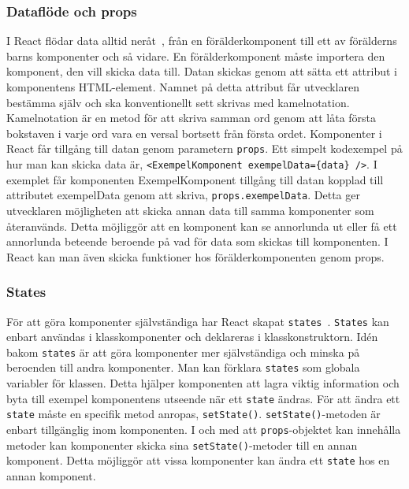 \subsubsection{Dataflöde och props}
I React flödar data alltid neråt~\cite{react-states}, från en förälderkomponent till ett av förälderns barns komponenter och så vidare. En förälderkomponent måste importera den komponent, den vill skicka data till. Datan skickas genom att sätta ett attribut i komponentens HTML-element. Namnet på detta attribut får utvecklaren bestämma själv och ska konventionellt sett skrivas med kamelnotation. Kamelnotation är en metod för att skriva samman ord genom att låta första bokstaven i varje ord vara en versal bortsett från första ordet. Komponenter i React får tillgång till datan genom parametern \texttt{props}. Ett simpelt kodexempel på hur man kan skicka data är, \texttt{<ExempelKomponent exempelData=\{data\} />}. I exemplet får komponenten ExempelKomponent tillgång till datan kopplad till attributet exempelData genom att skriva, \texttt{props.exempelData}. Detta ger utvecklaren möjligheten att skicka annan data till samma komponenter som återanvänds. Detta möjliggör att en komponent kan se annorlunda ut eller få ett annorlunda beteende beroende på vad för data som skickas till komponenten. I React kan man även skicka funktioner hos förälderkomponenten genom props. 

\subsubsection{States}
\label{axel:react-states} 
För att göra komponenter självständiga har React skapat \texttt{states}~\cite{react-states}. \texttt{States} kan enbart användas i klasskomponenter och deklareras i klasskonstruktorn. Idén bakom \texttt{states} är att göra komponenter mer självständiga och minska på beroenden till andra komponenter. Man kan förklara \texttt{states} som globala variabler för klassen. Detta hjälper komponenten att lagra viktig information och byta till exempel komponentens utseende när ett \texttt{state} ändras. För att ändra ett \texttt{state} måste en specifik metod anropas, \texttt{setState()}. \texttt{setState()}-metoden är enbart tillgänglig inom komponenten. I och med att \texttt{props}-objektet kan innehålla metoder kan komponenter skicka sina \texttt{setState()}-metoder till en annan komponent. Detta möjliggör att vissa komponenter kan ändra ett \texttt{state} hos en annan komponent.


